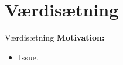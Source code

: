 \section{Værdisætning}

\begin{frame}{Værdisætning}
    \textbf{Motivation:}
    \begin{itemize}
      \item Issue.
    \end{itemize}
\end{frame}

